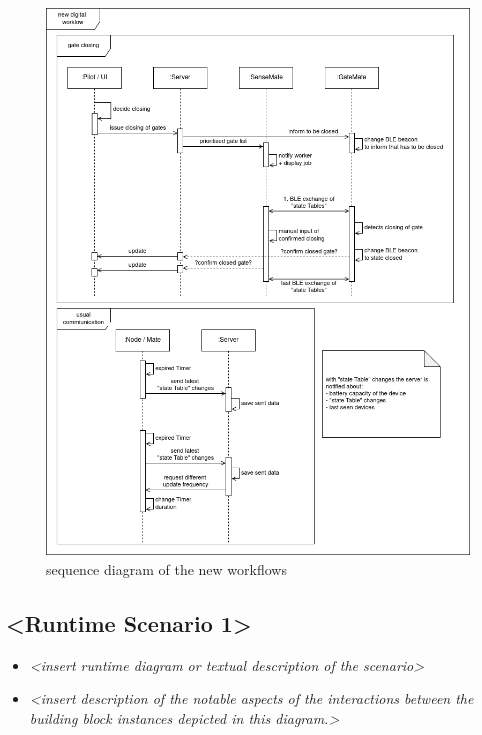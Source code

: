 \documentclass[
]{article}
\begin{document}
\begin{figure}[H]
  \centering
  \includegraphics[width=\textwidth]{images/sequence_diagram-new.png}
  \caption{sequence diagram of the new workflows}
  \label{fig:seq_intro_new}
\end{figure}

\hypertarget{__runtime_scenario_1}{%
\subsection{\textless Runtime Scenario
1\textgreater{}}\label{__runtime_scenario_1}}

\begin{itemize}
\item
  \emph{\textless insert runtime diagram or textual description of the
  scenario\textgreater{}}
\item
  \emph{\textless insert description of the notable aspects of the
  interactions between the building block instances depicted in this
  diagram.\textgreater{}}
\end{itemize}
\end{document}
